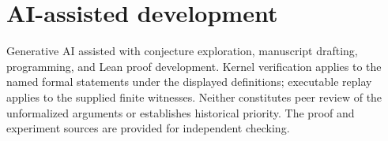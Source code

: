 \documentclass[11pt]{article}
\theoremstyle{definition}
\theoremstyle{remark}
\begin{document}
\section*{AI-assisted development}
Generative AI assisted with conjecture exploration, manuscript drafting,
programming, and Lean proof development. Kernel verification applies to
the named formal statements under the displayed definitions; executable
replay applies to the supplied finite witnesses. Neither constitutes
peer review of the unformalized arguments or establishes historical
priority. The proof and experiment sources are provided for independent
checking.



\end{document}
